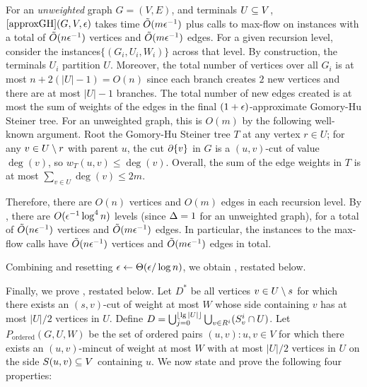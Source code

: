 \BL{}
For an \emph{unweighted} graph $G=(V,E)$, and terminals $U\subseteq V$, $\ref{approxGH}(G,V,\epsilon)$ takes time $\tilde{O}(m\epsilon^{-1})$ plus calls to max-flow on instances with a total of $\tilde{O}(n\epsilon^{-1})$ vertices and $\tilde{O}(m\epsilon^{-1})$ edges.%
\EL
\BP
For a given recursion level, consider the instances\linebreak $\{ (G_i,U_i,W_i)\}$ across that level. By construction, the terminals $U_i$ partition $U$. Moreover, the total number of vertices over all $G_i$ is at most $n+2(|U|-1)=O(n)$ since each branch creates $2$ new vertices and there are at most $|U|-1$ branches. The total number of new edges created is at most the sum of weights of the edges in the final $(1+\epsilon)$-approximate Gomory-Hu Steiner tree. For an unweighted graph, this is $O(m)$ by the following well-known argument. Root the Gomory-Hu Steiner tree $T$ at any vertex $r\in U$; for any $v\in U\setminus r$ with parent $u$, the cut $\partial\{v\}$ in $G$ is a $(u,v)$-cut of value $\deg(v)$, so $w_T(u,v)\le\deg(v)$. Overall, the sum of the edge weights in $T$ is at most $\sum_{v\in U}\deg(v)\le2m$.

Therefore, there are $O(n)$ vertices and $O(m)$ edges in each recursion level. By , there are $O(\epsilon^{-1}\log^4n)$ levels (since $\Delta=1$ for an unweighted graph), for a total of $\tilde{O}(n\epsilon^{-1})$ vertices and $\tilde{O}(m\epsilon^{-1})$ edges. In particular, the instances to the max-flow calls have $\tilde{O}(n\epsilon^{-1})$ vertices and $\tilde{O}(m\epsilon^{-1})$ edges in total.
\EP

Combining  and resetting $\epsilon\gets\Theta(\epsilon/\log n)$, we obtain , restated below.
\ApproxU*

Finally, we prove , restated below.
\LemD*
\BP
Let $D^*$ be all vertices $v\in U\setminus s$ for which there exists an $(s,v)$-cut of weight at most $W$ whose side containing $v$ has at most $|U|/2$ vertices in $U$. Define $D = \bigcup_{j=0}^{\lfloor\lg|U|\rfloor}\bigcup_{v\in R^i} (S^i_v\cap U)$.
Let $P_{\text{ordered}}(G,U,W)$ be the set of ordered pairs $(u,v):u,v\in V$ for which there exists an $(u,v)$-mincut of weight at most $W$ with at most $|U|/2$ vertices in $U$ on the side $S(u,v)\subseteq V$ containing $u$. %
We now state and prove the following four properties:

